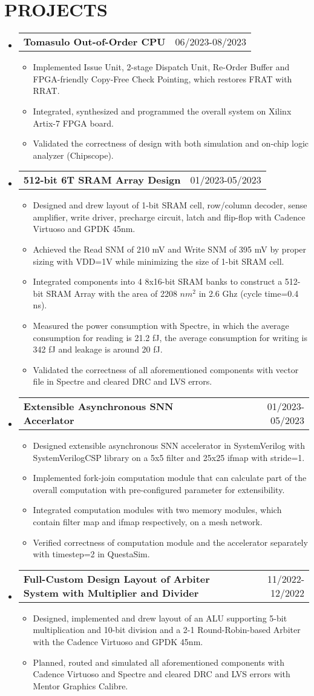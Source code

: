 \documentclass[letterpaper,11pt]{article}
\makeatletter
\newcommand{\resumeItemOne}[1]{
  \item\small{#1}
}
\newcommand{\resumeSubheadingNoTitle}[2]{
  \vspace{-1pt}\item
    \begin{tabular*}{0.97\textwidth}[t]{l@{\extracolsep{\fill}}r}
      \textbf{#1} & #2 %
    \end{tabular*}\vspace{-5pt}
}
\newcommand{\resumeSubHeadingListStart}{\begin{itemize}[leftmargin=*]}
\newcommand{\resumeSubHeadingListEnd}{\end{itemize}\vspace{-5pt}}
\newcommand{\resumeItemListStart}{\begin{itemize}}
\newcommand{\resumeItemListEnd}{\end{itemize}\vspace{-10pt}}
\makeatother
\begin{document}
\section{PROJECTS}
\resumeSubHeadingListStart
\resumeSubheadingNoTitle
    {Tomasulo Out-of-Order CPU}{06/2023-08/2023}
\resumeItemListStart
	\resumeItemOne{Implemented Issue Unit, 2-stage Dispatch Unit, Re-Order Buffer and FPGA-friendly Copy-Free Check Pointing, which restores FRAT with RRAT.}
	\resumeItemOne{Integrated, synthesized and programmed the overall system on Xilinx Artix-7 FPGA board.}
	\resumeItemOne{Validated the correctness of design with both simulation and on-chip logic analyzer (Chipscope).}
\resumeItemListEnd
\resumeSubheadingNoTitle
    {512-bit 6T SRAM Array Design}{01/2023-05/2023}
\resumeItemListStart
	\resumeItemOne{Designed and drew layout of 1-bit SRAM cell, row/column decoder, sense amplifier, write driver, precharge circuit, latch and flip-flop with Cadence Virtuoso and GPDK 45nm.}
	\resumeItemOne{Achieved the Read SNM of 210 mV and Write SNM of 395 mV by proper sizing with VDD=1V while minimizing the size of 1-bit SRAM cell.}
	\resumeItemOne{Integrated components into 4 8x16-bit SRAM banks to construct a 512-bit SRAM Array with the area of 2208 $nm^2$ in 2.6 Ghz (cycle time=0.4 ns).}
	\resumeItemOne{Measured the power consumption with Spectre, in which the average consumption for reading is 21.2 fJ, the average consumption for writing is 342 fJ and leakage is around 20 fJ.}
	\resumeItemOne{Validated the correctness of all aforementioned components with vector file in Spectre and cleared DRC and LVS errors.}
\resumeItemListEnd
\resumeSubheadingNoTitle
    {Extensible Asynchronous SNN Accerlator}{01/2023-05/2023}
\resumeItemListStart
	\resumeItemOne{Designed extensible asynchronous SNN accelerator in SystemVerilog with SystemVerilogCSP library on a 5x5 filter and 25x25 ifmap with stride=1.}
	\resumeItemOne{Implemented fork-join computation module that can calculate part of the overall computation with pre-configured parameter for extensibility.}
	\resumeItemOne{Integrated computation modules with two memory modules, which contain filter map and ifmap respectively, on a mesh network.}
	\resumeItemOne{Verified correctness of computation module and the accelerator separately with timestep=2 in QuestaSim.}
\resumeItemListEnd
\resumeSubheadingNoTitle
    {Full-Custom Design Layout of Arbiter System with Multiplier and Divider}{11/2022-12/2022}
\resumeItemListStart
	\resumeItemOne{Designed, implemented and drew layout of an ALU supporting 5-bit multiplication and 10-bit division and a 2-1 Round-Robin-based Arbiter with the Cadence Virtuoso and GPDK 45nm.}
	\resumeItemOne{Planned, routed and simulated all aforementioned components with Cadence Virtuoso and Spectre and cleared DRC and LVS errors with Mentor Graphics Calibre.}
\resumeItemListEnd
\resumeSubHeadingListEnd
\end{document}
